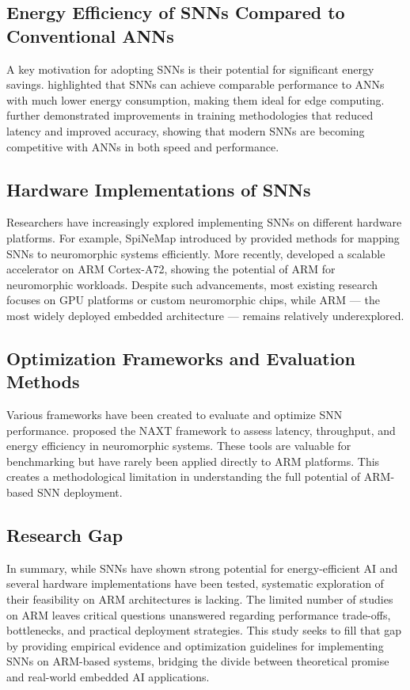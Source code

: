 \documentclass[a4paper,12pt]{article}
\begin{document}
	\subsection{Energy Efficiency of SNNs Compared to Conventional ANNs}
	A key motivation for adopting SNNs is their potential for significant energy savings. \citet{Yang2019} highlighted that SNNs can achieve comparable performance to ANNs with much lower energy consumption, making them ideal for edge computing. \citet{Bu2022} further demonstrated improvements in training methodologies that reduced latency and improved accuracy, showing that modern SNNs are becoming competitive with ANNs in both speed and performance.
	
	\subsection{Hardware Implementations of SNNs}
	Researchers have increasingly explored implementing SNNs on different hardware platforms. For example, SpiNeMap introduced by \citet{Balaji2019} provided methods for mapping SNNs to neuromorphic systems efficiently. More recently, \citet{Goma2023} developed a scalable accelerator on ARM Cortex-A72, showing the potential of ARM for neuromorphic workloads. Despite such advancements, most existing research focuses on GPU platforms or custom neuromorphic chips, while ARM — the most widely deployed embedded architecture — remains relatively underexplored.
	
	\subsection{Optimization Frameworks and Evaluation Methods}
	Various frameworks have been created to evaluate and optimize SNN performance. \citet{Abderrahmane2020} proposed the NAXT framework to assess latency, throughput, and energy efficiency in neuromorphic systems. These tools are valuable for benchmarking but have rarely been applied directly to ARM platforms. This creates a methodological limitation in understanding the full potential of ARM-based SNN deployment.
	
	\subsection{Research Gap}
	In summary, while SNNs have shown strong potential for energy-efficient AI and several hardware implementations have been tested, systematic exploration of their feasibility on ARM architectures is lacking. The limited number of studies on ARM leaves critical questions unanswered regarding performance trade-offs, bottlenecks, and practical deployment strategies. This study seeks to fill that gap by providing empirical evidence and optimization guidelines for implementing SNNs on ARM-based systems, bridging the divide between theoretical promise and real-world embedded AI applications.
	
\end{document}
